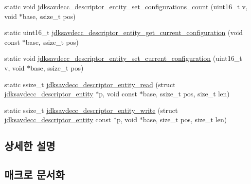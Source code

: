 \begin{DoxyCompactItemize}
\item 
static void \hyperlink{group__descriptor__entity_ga2cb3684cc977fb215fa645508953c83b}{jdksavdecc\+\_\+descriptor\+\_\+entity\+\_\+set\+\_\+configurations\+\_\+count} (uint16\+\_\+t v, void $\ast$base, ssize\+\_\+t pos)
\item 
static uint16\+\_\+t \hyperlink{group__descriptor__entity_ga92fc4030ec58a727c8c82a53e8f743e9}{jdksavdecc\+\_\+descriptor\+\_\+entity\+\_\+get\+\_\+current\+\_\+configuration} (void const $\ast$base, ssize\+\_\+t pos)
\item 
static void \hyperlink{group__descriptor__entity_gaf340ca89b805316f38254931cd20c1e7}{jdksavdecc\+\_\+descriptor\+\_\+entity\+\_\+set\+\_\+current\+\_\+configuration} (uint16\+\_\+t v, void $\ast$base, ssize\+\_\+t pos)
\item 
static ssize\+\_\+t \hyperlink{group__descriptor__entity_gaa15b23c453ef21a6675a4f9d8bcf54ce}{jdksavdecc\+\_\+descriptor\+\_\+entity\+\_\+read} (struct \hyperlink{structjdksavdecc__descriptor__entity}{jdksavdecc\+\_\+descriptor\+\_\+entity} $\ast$p, void const $\ast$base, ssize\+\_\+t pos, size\+\_\+t len)
\item 
static ssize\+\_\+t \hyperlink{group__descriptor__entity_ga5b144b7a8ef89d27ddbd5c2b7a4c4b59}{jdksavdecc\+\_\+descriptor\+\_\+entity\+\_\+write} (struct \hyperlink{structjdksavdecc__descriptor__entity}{jdksavdecc\+\_\+descriptor\+\_\+entity} const $\ast$p, void $\ast$base, size\+\_\+t pos, size\+\_\+t len)
\end{DoxyCompactItemize}


\subsection{상세한 설명}


\subsection{매크로 문서화}
